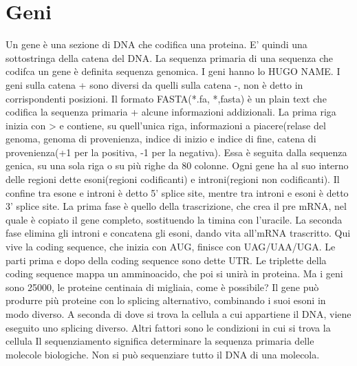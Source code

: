 \chapter{Geni}
Un gene è una sezione di DNA che codifica una proteina. E' quindi una sottostringa della catena del DNA. La sequenza primaria di una sequenza che codifca un gene è definita sequenza genomica. I geni hanno lo HUGO NAME. I geni sulla catena + sono diversi da quelli sulla catena -, non è detto in corrispondenti posizioni.
Il formato FASTA(*.fa, *,fasta) è un plain text che codifica la sequenza primaria + alcune informazioni addizionali.
La prima riga inizia con > e contiene, su quell'unica riga, informazioni a piacere(relase del genoma, genoma di provenienza, indice di inizio e indice di fine, catena di provenienza(+1 per la positiva, -1 per la negativa). Essa è seguita dalla sequenza genica, su una sola riga o su più righe da 80 colonne.
Ogni gene ha al suo interno delle regioni dette esoni(regioni codificanti) e introni(regioni non codificanti). Il confine tra esone e introni è detto 5' splice site, mentre tra introni e esoni è detto 3' splice site.
La prima fase è quello della trascrizione, che crea il pre mRNA, nel quale è copiato il gene completo, sostituendo la timina con l'uracile.
La seconda fase elimina gli introni e concatena gli esoni, dando vita all'mRNA trascritto. Qui vive la coding sequence, che inizia con AUG, finisce con UAG/UAA/UGA.
Le parti prima e dopo della coding sequence sono dette UTR. Le triplette della coding sequence mappa un amminoacido, che poi si unirà in proteina. 
Ma i geni sono 25000, le proteine centinaia di migliaia, come è possibile?
Il gene può produrre più proteine con lo splicing alternativo, combinando i suoi esoni in modo diverso. A seconda di dove si trova la cellula a cui appartiene il DNA, viene eseguito uno splicing diverso. Altri fattori sono le condizioni in cui si trova la cellula
Il sequenziamento significa determinare la sequenza primaria delle molecole biologiche. Non si può sequenziare tutto il DNA di una molecola.